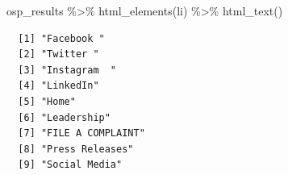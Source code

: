 \documentclass[
  letterpaper,
  DIV=11,
  numbers=noendperiod]{scrreprt}
\newenvironment{Shaded}{\begin{snugshade}}{\end{snugshade}}
\newcommand{\FunctionTok}[1]{\textcolor[rgb]{0.28,0.35,0.67}{#1}}
\newcommand{\NormalTok}[1]{\textcolor[rgb]{0.00,0.23,0.31}{#1}}
\newcommand{\SpecialCharTok}[1]{\textcolor[rgb]{0.37,0.37,0.37}{#1}}
\newcommand{\StringTok}[1]{\textcolor[rgb]{0.13,0.47,0.30}{#1}}
\begin{document}
\begin{Shaded}
\begin{Highlighting}[]
\NormalTok{osp\_results }\SpecialCharTok{\%\textgreater{}\%} \FunctionTok{html\_elements}\NormalTok{(}\StringTok{\textquotesingle{}li\textquotesingle{}}\NormalTok{) }\SpecialCharTok{\%\textgreater{}\%} \FunctionTok{html\_text}\NormalTok{()}
\end{Highlighting}
\end{Shaded}

\begin{verbatim}
  [1] "Facebook "                                                                                                                                                                                                                                           
  [2] "Twitter "                                                                                                                                                                                                                                            
  [3] "Instagram  "                                                                                                                                                                                                                                         
  [4] "LinkedIn"                                                                                                                                                                                                                                            
  [5] "Home"                                                                                                                                                                                                                                                
  [6] "Leadership"                                                                                                                                                                                                                                          
  [7] "FILE A COMPLAINT"                                                                                                                                                                                                                                    
  [8] "Press Releases"                                                                                                                                                                                                                                      
  [9] "Social Media"                                                                                                                                                                                                                                        

\end{verbatim}
\end{document}
